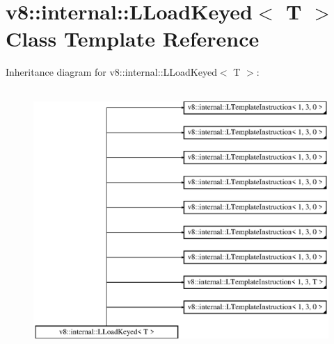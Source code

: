 \hypertarget{classv8_1_1internal_1_1_l_load_keyed}{}\section{v8\+:\+:internal\+:\+:L\+Load\+Keyed$<$ T $>$ Class Template Reference}
\label{classv8_1_1internal_1_1_l_load_keyed}
Inheritance diagram for v8\+:\+:internal\+:\+:L\+Load\+Keyed$<$ T $>$\+:\begin{figure}[H]
\begin{center}
\leavevmode
\includegraphics[height=10.000000cm]{classv8_1_1internal_1_1_l_load_keyed}
\end{center}
\end{figure}
